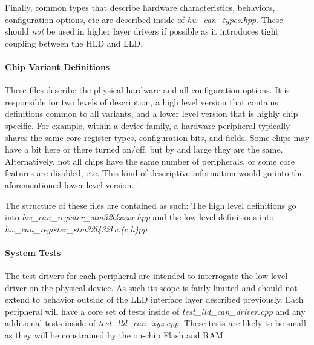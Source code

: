 \documentclass[10pt, letterpaper, tikz]{article}
\begin{document}
      Finally, common types that describe hardware characteristics, behaviors, configuration options, etc are
      described inside of \emph{hw\_can\_types.hpp}. These should \emph{not} be used in higher layer drivers
      if possible as it introduces tight coupling between the HLD and LLD.\newline

  \paragraph{Chip Variant Definitions}\mbox{}\newline
    These files describe the physical hardware and all configuration options. It is responsible for
    two levels of description, a high level version that contains definitions common to all variants, and a
    lower level version that is highly chip specific. For example, within a device family, a hardware peripheral
    typically shares the same core register types, configuration bits, and fields. Some chips may have a bit here
    or there turned on/off, but by and large they are the same. Alternatively, not all chips have the same number
    of peripherals, or some core features are disabled, etc. This kind of descriptive information would go into the
    aforementioned lower level version. \newline

  \par
    The structure of these files are contained as such: The high level definitions go into \emph{hw\_can\_register\_stm32l4xxxx.hpp}
    and the low level definitions into \emph{hw\_can\_register\_stm32l432kc.(c,h)pp}

  \paragraph{System Tests}\mbox{}\newline
    The test drivers for each peripheral are intended to interrogate the low level driver on the
    physical device. As such its scope is fairly limited and should not extend to behavior outside
    of the LLD interface layer described previously. Each peripheral will have a core set of tests
    inside of \emph{test\_lld\_can\_driver.cpp} and any additional tests inside of
    \emph{test\_lld\_can\_xyz.cpp}. These tests are likely to be small as they will be
    constrained by the on-chip Flash and RAM. \newline
\end{document}
